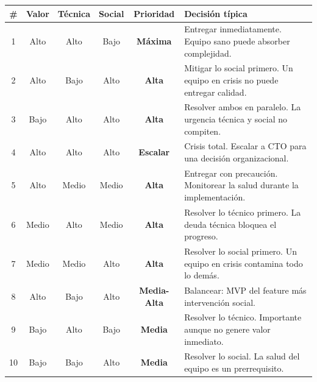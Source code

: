 \begin{table}[h]
    \centering
    \footnotesize
    \begin{tabularx}{\textwidth}{|c|c|c|c|c|X|}
        \hline
        \textbf{\#} & \textbf{Valor} & \textbf{Técnica} & \textbf{Social} & \textbf{Prioridad}  & \textbf{Decisión típica}                                                  \\
        \hline
        1           & Alto           & Alto             & Bajo            & \textbf{Máxima}     & Entregar inmediatamente. Equipo sano puede absorber complejidad.          \\
        \hline
        2           & Alto           & Bajo             & Alto            & \textbf{Alta}       & Mitigar lo social primero. Un equipo en crisis no puede entregar calidad. \\
        \hline
        3           & Bajo           & Alto             & Alto            & \textbf{Alta}       & Resolver ambos en paralelo. La urgencia técnica y social no compiten.     \\
        \hline
        4           & Alto           & Alto             & Alto            & \textbf{Escalar}    & Crisis total. Escalar a CTO para una decisión organizacional.             \\
        \hline
        5           & Alto           & Medio            & Medio           & \textbf{Alta}       & Entregar con precaución. Monitorear la salud durante la implementación.   \\
        \hline
        6           & Medio          & Alto             & Medio           & \textbf{Alta}       & Resolver lo técnico primero. La deuda técnica bloquea el progreso.        \\
        \hline
        7           & Medio          & Medio            & Alto            & \textbf{Alta}       & Resolver lo social primero. Un equipo en crisis contamina todo lo demás.  \\
        \hline
        8           & Alto           & Bajo             & Alto            & \textbf{Media-Alta} & Balancear: MVP del feature más intervención social.                       \\
        \hline
        9           & Bajo           & Alto             & Bajo            & \textbf{Media}      & Resolver lo técnico. Importante aunque no genere valor inmediato.         \\
        \hline
        10          & Bajo           & Bajo             & Alto            & \textbf{Media}      & Resolver lo social. La salud del equipo es un prerrequisito.              \\

\end{tabularx}
\end{table}
